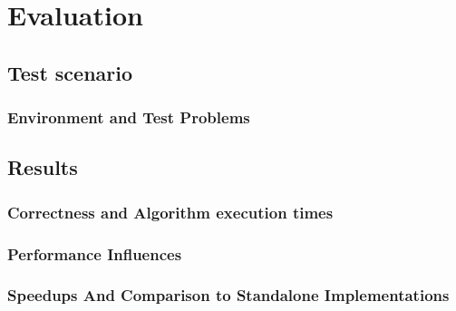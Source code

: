 \section{Evaluation}
\subsection{Test scenario}
\begin{frame}
\frametitle{Environment and Test Problems}
\end{frame}
\subsection{Results}
\begin{frame}
\frametitle{Correctness and Algorithm execution times}
\end{frame}
\begin{frame}
\frametitle{Performance Influences}
\end{frame}
\begin{frame}
\frametitle{Speedups And Comparison to Standalone Implementations}
\end{frame}